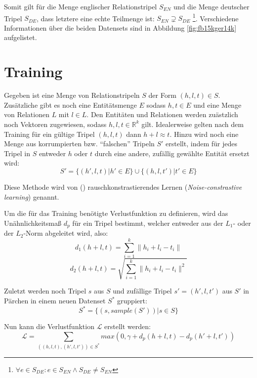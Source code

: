 Somit gilt für die Menge englischer Relationstripel $S_{EN}$ und die Menge deutscher Tripel $S_{DE}$, dass letztere
eine echte Teilmenge ist: $S_{EN} \supsetneq S_{DE}$ \footnote{$\forall e \in S_{DE}: e \in S_{EN} \wedge S_{DE} \neq S_{EN}$}.
Verschiedene Informationen über die beiden Datensets sind in Abbildung \ref{fig:fb15kger14k} aufgelistet.

\section{Training}

Gegeben ist eine Menge von Relationstripeln $S$ der Form $(h, l, t) \in S$. Zusätzliche gibt es noch eine Entitätsmenge
$E$ sodass $h, t \in E$ und eine Menge von Relationen $L$ mit $l \in L$. Den Entitäten und Relationen werden zuästzlich
noch Vektoren zugewiesen, sodass $h, l, t \in \mathbb{R}^k$ gilt. Idealerweise gelten nach dem Training für ein gültige Tripel $(h, l, t)$
dann $h + l \approx t$. Hinzu wird noch eine Menge aus korrumpierten bzw. ``falschen'' Tripeln $S'$ erstellt, indem
für jedes Tripel in $S$ entweder $h$ oder $t$ durch eine andere, zufällig gewählte Entität ersetzt wird:
\begin{equation}
  S' = \{(h', l, t) | h' \in E\} \cup \{(h, l, t') | t' \in E\}
\end{equation}

Diese Methode wird von (\cite{bordes2013translating}) rauschkonstrastierendes Lernen (\emph{Noise-constrastive learning})
genannt.

Um die für das Training benötigte Verlustfunktion zu definieren, wird das Unähnlichkeitsmaß $d_p$ für ein Tripel bestimmt, welcher
entweder aus der $L_1$- oder der $L_2$-Norm abgeleitet wird, also:
\begin{equation}
    d_1(h + l, t) = \sum_{i=1}^k \| h_i + l_i - t_i \|
\end{equation}
\begin{equation}
    d_2(h + l, t) = \sqrt{\sum_{i=1}^k \| h_i + l_i - t_i \|^2}
\end{equation}

Zuletzt werden noch Tripel $s$ aus $S$ und zufällige Tripel $s'=(h', l, t')$ aus $S'$ in Pärchen in einem neuen Datenset $S^*$ gruppiert:
\begin{equation}
  S^* = \{(s, sample(S'))| s \in S\}
\end{equation}

Nun kann die Verlustfunktion $\mathcal{L}$ erstellt werden:
\begin{equation}\label{form:lossf}
  \mathcal{L} = \sum_{((h,l,t), (h', l, t')) \in S^*} max(0, \gamma + d_p(h + l, t) - d_p(h' + l, t'))
\end{equation}

